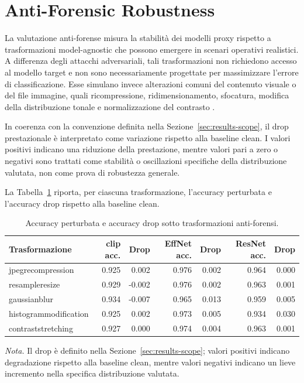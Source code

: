 \section{Anti-Forensic Robustness}
\label{sec:results-antiforensic}

La valutazione anti-forense misura la stabilità dei modelli proxy rispetto a
trasformazioni model-agnostic che possono emergere in scenari operativi
realistici. A differenza degli attacchi adversariali, tali trasformazioni non
richiedono accesso al modello target e non sono necessariamente progettate per
massimizzare l'errore di classificazione. Esse simulano invece alterazioni comuni
del contenuto visuale o del file immagine, quali ricompressione,
ridimensionamento, sfocatura, modifica della distribuzione tonale e
normalizzazione del contrasto
\cite{stamm2010anti,yaacoub2021digital,hendrycks2019benchmarking}.

In coerenza con la convenzione definita nella
Sezione~\ref{sec:results-scope}, il drop prestazionale è interpretato come
variazione rispetto alla baseline clean. I valori positivi indicano una
riduzione della prestazione, mentre valori pari a zero o negativi sono trattati
come stabilità o oscillazioni specifiche della distribuzione valutata, non come
prova di robustezza generale.

La Tabella~\ref{tab:results-antiforensic-robustness} riporta, per ciascuna
trasformazione, l'accuracy perturbata e l'accuracy drop rispetto alla baseline
clean.

\begin{table}[H]
\centering
\scriptsize
\setlength{\tabcolsep}{3.3pt}
\renewcommand{\arraystretch}{1.15}
\caption{Accuracy perturbata e accuracy drop sotto trasformazioni anti-forensi.}
\label{tab:results-antiforensic-robustness}
\begin{tabular}{@{}l r r r r r r@{}}
\toprule
\textbf{Trasformazione} &
\textbf{\gls{clip} acc.} & \textbf{Drop} &
\textbf{EffNet acc.} & \textbf{Drop} &
\textbf{ResNet acc.} & \textbf{Drop} \\
\midrule
\gls{jpegrecompression} & 0.925 & 0.002 & 0.976 & 0.002 & 0.964 & 0.000 \\
\gls{resampleresize} & 0.929 & -0.002 & 0.976 & 0.002 & 0.963 & 0.001 \\
\gls{gaussianblur} & 0.934 & -0.007 & 0.965 & 0.013 & 0.959 & 0.005 \\
\gls{histogrammodification} & 0.925 & 0.002 & 0.973 & 0.005 & 0.934 & 0.030 \\
\gls{contraststretching} & 0.927 & 0.000 & 0.974 & 0.004 & 0.963 & 0.001 \\
\bottomrule
\end{tabular}

\vspace{0.4em}
\footnotesize
\textit{Nota.} Il drop è definito nella Sezione~\ref{sec:results-scope};
valori positivi indicano degradazione rispetto alla baseline clean, mentre valori
negativi indicano un lieve incremento nella specifica distribuzione valutata.
\end{table}

